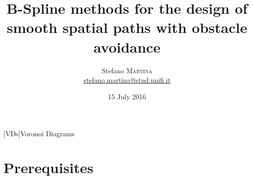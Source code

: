 





\title[]{\textbf{B-Spline methods for the design of smooth spatial
  paths with obstacle avoidance}}
\date[15 July 2016]{15 July 2016}

\author[Martina Stefano]{
  \begin{center}
    \begin{tabular}{lr}
      Stefano \textsc{Martina}\\
      \href{mailto:stefano.martina@stud.unifi.it}{stefano.martina@stud.unifi.it}\\
    \end{tabular}
  \end{center}
}



[VDs]{Voronoi Diagrams}

\begin{frame}[plain]
  \titlepage
\end{frame}

\section{Prerequisites}


